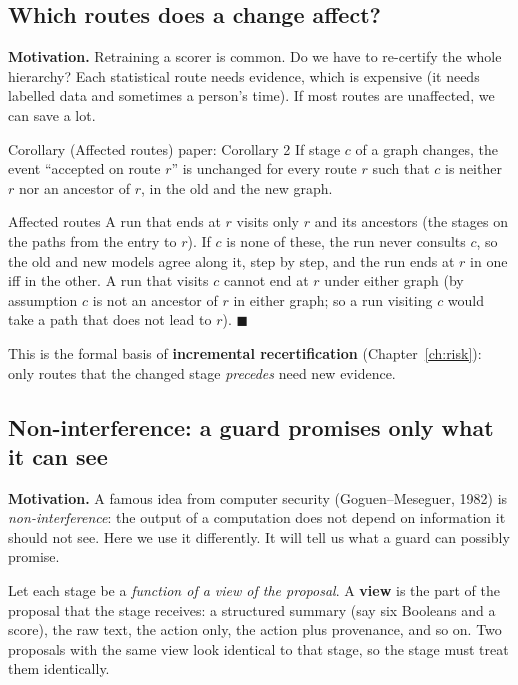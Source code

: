 \subsection{Which routes does a change affect?}

\textbf{Motivation.} Retraining a scorer is common. Do we have to re-certify the whole hierarchy? Each statistical route needs evidence, which is expensive (it needs labelled data and sometimes a person's time). If most routes are unaffected, we can save a lot.

\begin{statement}{Corollary (Affected routes) \hfill\normalfont paper: Corollary 2}
If stage $c$ of a graph changes, the event ``accepted on route $r$'' is unchanged for every route $r$ such that $c$ is neither $r$ nor an ancestor of $r$, in the old and the new graph.
\end{statement}

\begin{plainproof}{Affected routes}
A run that ends at $r$ visits only $r$ and its ancestors (the stages on the paths from the entry to $r$). If $c$ is none of these, the run never consults $c$, so the old and new models agree along it, step by step, and the run ends at $r$ in one iff in the other. A run that visits $c$ cannot end at $r$ under either graph (by assumption $c$ is not an ancestor of $r$ in either graph; so a run visiting $c$ would take a path that does not lead to $r$). \hfill$\blacksquare$
\end{plainproof}

This is the formal basis of \textbf{incremental recertification} (Chapter~\ref{ch:risk}): only routes that the changed stage \emph{precedes} need new evidence.

\subsection{Non-interference: a guard promises only what it can see}

\textbf{Motivation.} A famous idea from computer security (Goguen--Meseguer, 1982) is \emph{non-interference}: the output of a computation does not depend on information it should not see. Here we use it differently. It will tell us what a guard can possibly promise.

Let each stage be a \emph{function of a view of the proposal}. A \textbf{view} is the part of the proposal that the stage receives: a structured summary (say six Booleans and a score), the raw text, the action only, the action plus provenance, and so on. Two proposals with the same view look identical to that stage, so the stage must treat them identically.

